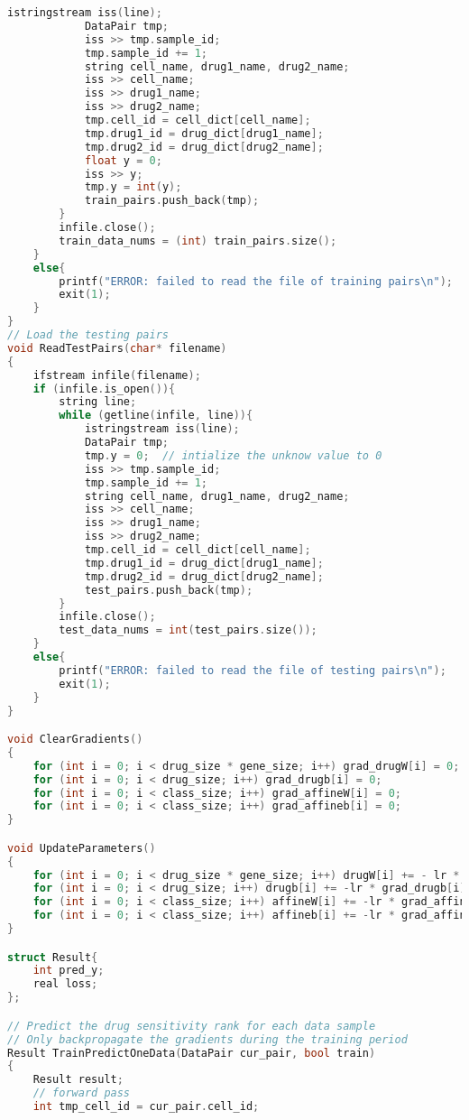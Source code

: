 \documentclass{article}
\begin{document}
\begin{lstlisting}[language=c++]
            istringstream iss(line);
            DataPair tmp;
            iss >> tmp.sample_id;
            tmp.sample_id += 1;
            string cell_name, drug1_name, drug2_name;
            iss >> cell_name;
            iss >> drug1_name;
            iss >> drug2_name;
            tmp.cell_id = cell_dict[cell_name];
            tmp.drug1_id = drug_dict[drug1_name];
            tmp.drug2_id = drug_dict[drug2_name];
            float y = 0;
            iss >> y;
            tmp.y = int(y);
            train_pairs.push_back(tmp);
        }
        infile.close();
        train_data_nums = (int) train_pairs.size();
    }
    else{
        printf("ERROR: failed to read the file of training pairs\n");
        exit(1);
    }
}
// Load the testing pairs
void ReadTestPairs(char* filename)
{
    ifstream infile(filename);
    if (infile.is_open()){
        string line;
        while (getline(infile, line)){
            istringstream iss(line);
            DataPair tmp;
            tmp.y = 0;  // intialize the unknow value to 0
            iss >> tmp.sample_id;
            tmp.sample_id += 1;
            string cell_name, drug1_name, drug2_name;
            iss >> cell_name;
            iss >> drug1_name;
            iss >> drug2_name;
            tmp.cell_id = cell_dict[cell_name];
            tmp.drug1_id = drug_dict[drug1_name];
            tmp.drug2_id = drug_dict[drug2_name];
            test_pairs.push_back(tmp);
        }
        infile.close();
        test_data_nums = int(test_pairs.size());
    }
    else{
        printf("ERROR: failed to read the file of testing pairs\n");
        exit(1);
    }
}

void ClearGradients()
{
    for (int i = 0; i < drug_size * gene_size; i++) grad_drugW[i] = 0;
    for (int i = 0; i < drug_size; i++) grad_drugb[i] = 0;
    for (int i = 0; i < class_size; i++) grad_affineW[i] = 0;
    for (int i = 0; i < class_size; i++) grad_affineb[i] = 0;
}

void UpdateParameters()
{
    for (int i = 0; i < drug_size * gene_size; i++) drugW[i] += - lr * grad_drugW[i];
    for (int i = 0; i < drug_size; i++) drugb[i] += -lr * grad_drugb[i];
    for (int i = 0; i < class_size; i++) affineW[i] += -lr * grad_affineW[i];
    for (int i = 0; i < class_size; i++) affineb[i] += -lr * grad_affineb[i];
}

struct Result{
    int pred_y;
    real loss;
};

// Predict the drug sensitivity rank for each data sample
// Only backpropagate the gradients during the training period
Result TrainPredictOneData(DataPair cur_pair, bool train)
{
    Result result;
    // forward pass
    int tmp_cell_id = cur_pair.cell_id;


\end{lstlisting}
\end{document}
